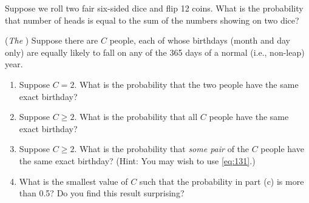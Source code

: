 \begin{challeges}
    \item Suppose we roll two fair six-sided dice and flip 12 coins. What is the probability that number of heads is equal to the sum of the numbers showing on two dice?
    \item (\emph{The} ) Suppose there are $C$ people, each of whose birthdays (month and day only) are equally likely to fall on any of the 365 days of a normal (i.e., non-leap) year.
        \begin{enumerate}
            \item Suppose $C=2$. What is the probability that the two people have the same exact birthday?
            \item Suppose $C\geqslant 2$. What is the probability that all $C$ people have the same exact birthday?
            \item Suppose $C\geqslant 2$. What is the probability that \emph{some pair} of the $C$ people have the same exact birthday? (Hint: You may wish to use \autoref{eq:131}.)
            \item What is the smallest value of $C$ such that the probability in part (c) is more than 0.5? Do you find this result surprising?
        \end{enumerate}
\end{challeges}
